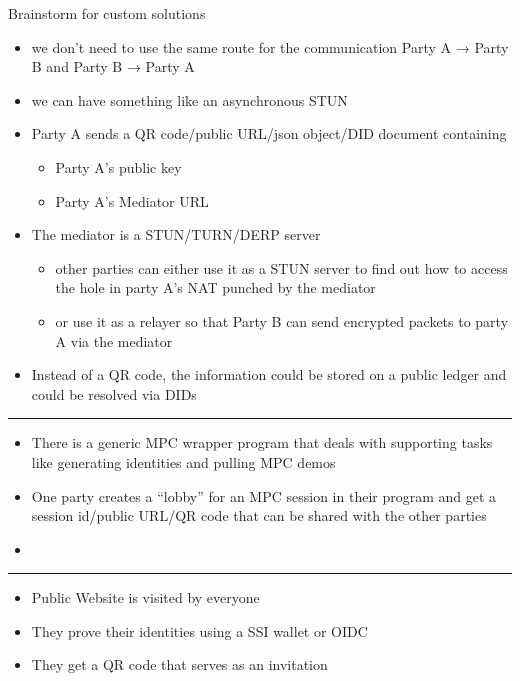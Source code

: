 \begin{frame}{Brainstorm for custom solutions}
\begin{itemize}
\tightlist
\item
  we don't need to use the same route for the communication Party A →
  Party B and Party B → Party A
\item
  we can have something like an asynchronous STUN
\item
  Party A sends a QR code/public URL/json object/DID document containing

  \begin{itemize}
  \tightlist
  \item
    Party A's public key
  \item
    Party A's Mediator URL
  \end{itemize}
\item
  The mediator is a STUN/TURN/DERP server

  \begin{itemize}
  \tightlist
  \item
    other parties can either use it as a STUN server to find out how to
    access the hole in party A's NAT punched by the mediator
  \item
    or use it as a relayer so that Party B can send encrypted packets to
    party A via the mediator
  \end{itemize}
\item
  Instead of a QR code, the information could be stored on a public
  ledger and could be resolved via DIDs
\end{itemize}

\begin{center}\rule{0.5\linewidth}{0.5pt}\end{center}

\begin{itemize}
\tightlist
\item
  There is a generic MPC wrapper program that deals with supporting
  tasks like generating identities and pulling MPC demos
\item
  One party creates a ``lobby'' for an MPC session in their program and
  get a session id/public URL/QR code that can be shared with the other
  parties
\item
\end{itemize}

\begin{center}\rule{0.5\linewidth}{0.5pt}\end{center}

\begin{itemize}
\tightlist
\item
  Public Website is visited by everyone
\item
  They prove their identities using a SSI wallet or OIDC
\item
  They get a QR code that serves as an invitation


\end{itemize}
\end{frame}
